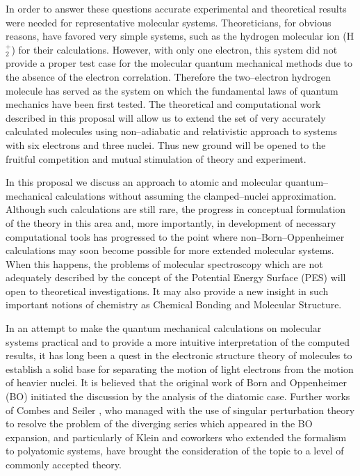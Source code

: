 In order to answer these questions accurate experimental
and theoretical results were needed for representative
molecular systems. Theoreticians, for obvious reasons, have
favored very simple systems, such as the hydrogen molecular
ion (H$_2^+$) for their calculations. However, with only one electron,
this system did not provide a proper test case for the molecular
quantum mechanical methods due to the absence of the
electron correlation. Therefore the two--electron hydrogen
molecule has served as the system on which the fundamental
laws of quantum mechanics have been first tested.
The theoretical and computational work described  in
this proposal will allow us to extend the set of very
accurately calculated molecules using non--adiabatic
and relativistic approach to systems with six electrons
and three nuclei. Thus new ground will be opened to
the fruitful competition and mutual stimulation of
theory and experiment.



In this proposal we discuss an approach to atomic and 
molecular quantum--mechanical calculations without assuming 
the clamped--nuclei approximation. Although such calculations
are still rare, the progress
in conceptual formulation of the theory in this area and, more
importantly, in development of necessary computational tools
has progressed to the point where non--Born--Oppenheimer
calculations may soon become possible for more extended molecular
systems. When this happens, 
the problems of molecular spectroscopy
which are not adequately described 
by the concept of the Potential Energy Surface (PES)
will open to theoretical investigations.
It may also provide a new insight in such important notions of
chemistry as Chemical Bonding and Molecular Structure.

In an attempt to make the quantum mechanical calculations on 
molecular systems practical and to provide a more intuitive
interpretation of the computed results, it has long been a quest
in the electronic structure theory of molecules 
to establish a solid base for separating
the motion of light electrons from the motion of heavier nuclei.
It is believed that the original work of Born and Oppenheimer (BO)
\cite{BO1927} initiated the discussion by the analysis
of the diatomic case. Further works of Combes and Seiler
\cite{CS1980}, who managed with the use of singular perturbation
theory to resolve the problem of the diverging series which appeared
in the BO expansion, and particularly of Klein and coworkers
\cite{KM1992} who extended the formalism to polyatomic systems,
have brought the consideration of the topic to a level of commonly
accepted theory.


